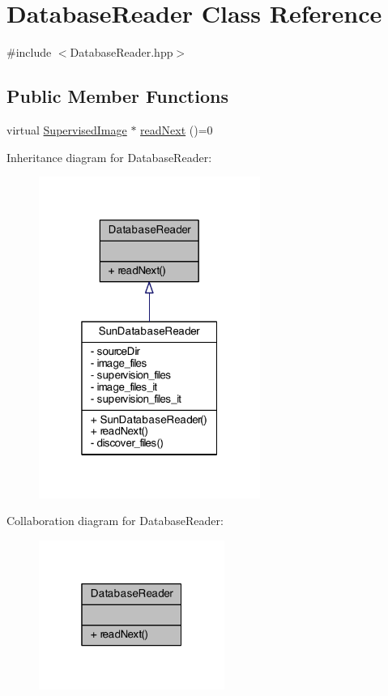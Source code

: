 \hypertarget{class_database_reader}{\section{Database\+Reader Class Reference}
\label{class_database_reader}
}


{\ttfamily \#include $<$Database\+Reader.\+hpp$>$}

\subsection*{Public Member Functions}
\begin{DoxyCompactItemize}
\item 
virtual \hyperlink{class_supervised_image}{Supervised\+Image} $\ast$ \hyperlink{class_database_reader_ae6a76cba6f3d4dad64b70b59c701b9f6}{read\+Next} ()=0
\end{DoxyCompactItemize}


Inheritance diagram for Database\+Reader\+:\nopagebreak
\begin{figure}[H]
\begin{center}
\leavevmode
\includegraphics[width=205pt]{class_database_reader__inherit__graph}
\end{center}
\end{figure}


Collaboration diagram for Database\+Reader\+:\nopagebreak
\begin{figure}[H]
\begin{center}
\leavevmode
\includegraphics[width=172pt]{class_database_reader__coll__graph}
\end{center}
\end{figure}


